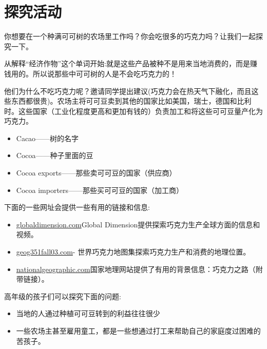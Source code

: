 \section{探究活动}
   你想要在一个种满可可树的农场里工作吗？你会吃很多的巧克力吗？让我们一起探究一下。\par
   从解释“经济作物”这个单词开始:就是这些产品被种不是用来当地消费的，而是赚钱用的。所以说那些中可可树的人是不会吃巧克力的！\par
   他们为什么不吃巧克力呢？邀请同学提出建议(巧克力会在热天气下融化，而且这些东西都很贵)。农场主将可可豆卖到其他的国家比如美国，瑞士，德国和比利时。这些国家（工业化程度更高和更加有钱的）负责加工和将这些可可豆量产化为巧克力。\par
   \begin{itemize}
     \item Cacao——树的名字
     \item Cocoa——种子里面的豆
     \item Cocoa exports——那些卖可可豆的国家（供应商） 
     \item Cocoa importers——那些买可可豆的国家（加工商）
   \end{itemize}   
   下面的一些网址会提供一些有用的链接和信息:\par
   \begin{itemize}
     \item \href{http://globaldimension.org.uk/news/item/14702}{globaldimension.com}Global Dimension提供探索巧克力生产全球方面的信息和视频。
     \item \href{http://www.sfu.ca/geog351fall03/groups-webpages/gp8/intro/intro.html}{geog351fall03.com}- 世界巧克力地图集探索巧克力生产和消费的地理位置。
     \item \href{http://ngm.nationalgeographic.com/ngm/0404/resources_geo2.html}{nationalgeographic.com}国家地理网站提供了有用的背景信息：巧克力之路（附带链接）。
   \end{itemize}
   高年级的孩子们可以探究下面的问题:\par
   \begin{itemize}
     \item 当地的人通过种植可可豆转到的利益往往很少
     \item 一些农场主甚至雇用童工，都是一些想通过打工来帮助自己的家庭度过困难的苦孩子。
   \end{itemize}  
   


